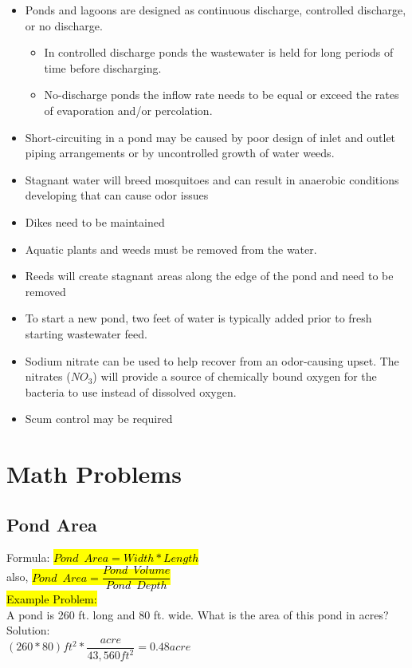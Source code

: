 \begin{itemize}
\item Ponds and lagoons are designed as continuous discharge, controlled discharge, or no discharge.
\begin{itemize}
\item In controlled discharge ponds the wastewater is held for long periods of time before discharging. 

\item No-discharge ponds the inflow rate needs to be equal or exceed the rates of evaporation and/or percolation. 
\end{itemize}
\item Short-circuiting in a pond may be caused by poor design of inlet and outlet piping arrangements or by uncontrolled growth of water weeds.
\item Stagnant water will breed mosquitoes and can result in anaerobic conditions developing that can cause odor issues 
\item Dikes need to be maintained
\item Aquatic plants and weeds must be removed from the water. 
\item Reeds will create stagnant areas along the edge of the pond and need to be removed
\item To start a new pond, two feet of water is typically added prior to fresh starting wastewater feed. 
\item Sodium nitrate can be used to help recover from an odor-causing upset. The nitrates ($NO_3$) will provide a source of chemically bound oxygen for the bacteria to use instead of dissolved oxygen.
\item Scum control may be required
\end{itemize}

\section{Math Problems}

\subsection{Pond Area}

Formula: \hl{$Pond \enspace Area=Width * Length$}\\
\vspace{0.2cm}
also,     \hl{$Pond \enspace Area=\dfrac{Pond \enspace Volume}{Pond \enspace Depth}$}\\
\vspace{0.2cm}
\hl{Example Problem:}\\
A pond is 260 ft. long and 80 ft. wide. What is the area of this pond in acres?\\ 
\vspace{0.2cm}
Solution:\\
\vspace{0.2cm}
$(260*80)ft^2*\dfrac{acre}{43,560ft^2}=\boxed{0.48acre}$

